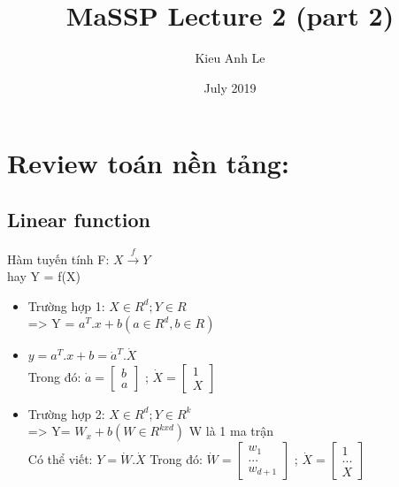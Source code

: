 \documentclass{article}
\title{MaSSP Lecture 2 (part 2)}
\author{Kieu Anh Le}
\date{July 2019}
\begin{document}
\maketitle

\section{Review toán nền tảng:}
\subsection{Linear function}
Hàm tuyến tính F: $X\overset{f}{\rightarrow}Y$\\
hay Y = f(X)
\begin{itemize}
    \item Trường hợp 1: $X\in R^d; Y\in R$ \\
    => Y = $a^T.x +b  (a\in R^d, b \in R)$ 
    \item $y = a^T.x + b = \dot{a}^T.\dot{X}$\\
    Trong đó: $\dot{a} = \begin{bmatrix}
            b\\
            a
            \end{bmatrix}$  ;
            $\dot{X} = \begin{bmatrix}
            1\\
            X
            \end{bmatrix}$
    \item Trường hợp 2: $X\in R^d; Y\in R^k$ \\
    => Y= $W_x + b (W \in R^{kxd})$ W là 1 ma trận\\
    Có thể viết: $Y=\dot{W}.\dot{X}$
    Trong đó: $\dot{W} = \begin{bmatrix}
            w_1\\
            ... \\
            w_{d+1}
            \end{bmatrix}$  ;
            $\dot{X} = \begin{bmatrix}
            1\\
            ...\\
            X
            \end{bmatrix}$
    
    
\end{itemize}

         
\end{document}

